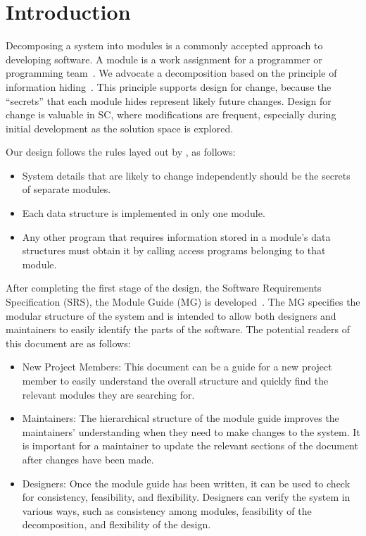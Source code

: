\documentclass[12pt, titlepage]{article}
\begin{document}
\newpage

\tableofcontents

\listoftables

\listoffigures

\newpage


\section{Introduction}

Decomposing a system into modules is a commonly accepted approach to developing
software.  A module is a work assignment for a programmer or programming
team~\citep{ParnasEtAl1984}.  We advocate a decomposition
based on the principle of information hiding~\citep{Parnas1972a}.  This
principle supports design for change, because the ``secrets'' that each module
hides represent likely future changes.  Design for change is valuable in SC,
where modifications are frequent, especially during initial development as the
solution space is explored.  

Our design follows the rules layed out by \citet{ParnasEtAl1984}, as follows:
\begin{itemize}
\item System details that are likely to change independently should be the
  secrets of separate modules.
\item Each data structure is implemented in only one module.
\item Any other program that requires information stored in a module's data
  structures must obtain it by calling access programs belonging to that module.
\end{itemize}

After completing the first stage of the design, the Software Requirements
Specification (SRS), the Module Guide (MG) is developed~\citep{ParnasEtAl1984}. The MG
specifies the modular structure of the system and is intended to allow both
designers and maintainers to easily identify the parts of the software.  The
potential readers of this document are as follows:

\begin{itemize}
\item New Project Members: This document can be a guide for a new project member
  to easily understand the overall structure and quickly find the
  relevant modules they are searching for.
\item Maintainers: The hierarchical structure of the module guide improves the
  maintainers' understanding when they need to make changes to the system. It is
  important for a maintainer to update the relevant sections of the document
  after changes have been made.
\item Designers: Once the module guide has been written, it can be used to
  check for consistency, feasibility, and flexibility. Designers can verify the
  system in various ways, such as consistency among modules, feasibility of the
  decomposition, and flexibility of the design.
\end{itemize}
\end{document}
